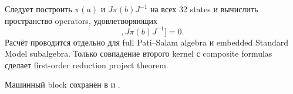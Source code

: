 \begin{protocol}
Следует построить \(\pi(a)\) и \(J\pi(b)J^{-1}\) на всех 32 states и
вычислить пространство operators, удовлетворяющих
\begin{equation}
 [[D_F,\pi(a)],J\pi(b)J^{-1}]=0.
\end{equation}
Расчёт проводится отдельно для full Pati--Salam algebra и embedded Standard
Model subalgebra. Только совпадение второго kernel с composite formulas
сделает first-order reduction project theorem.
\end{protocol}

Машинный block сохранён в
 и
.